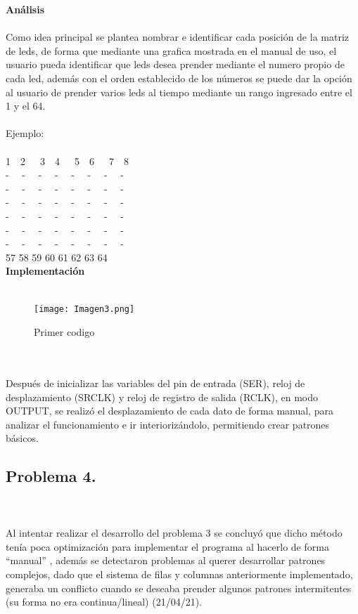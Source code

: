 \documentclass{article}
\begin{document}
\textbf{\large Análisis}\\\\
Como idea principal se plantea nombrar e identificar cada posición de la matriz de leds, de forma que mediante una grafica mostrada en el manual de uso, el usuario pueda identificar que leds desea prender mediante el numero propio de cada led, además con el orden establecido de los números se puede dar la opción al usuario de prender varios leds al tiempo mediante un rango ingresado entre el 1 y el 64.
\\
\\
Ejemplo:
\\
\\
1\  \ 2\ \ \ 3\  \ 4\ \ \ 5\  \ 6\ \ \ 7\  \ 8\\ 
- \  \  - \  \ - \  \ - \  \ - \  \ - \  \ - \   \ -\\
- \  \  - \  \ - \  \ - \  \ - \  \ - \  \ - \   \ -\\
- \  \  - \  \ - \  \ - \  \ - \  \ - \  \ - \   \ -\\
- \  \  - \  \ - \  \ - \  \ - \  \ - \  \ - \   \ -\\
- \  \  - \  \ - \  \ - \  \ - \  \ - \  \ - \   \ -\\
- \  \  - \  \ - \  \ - \  \ - \  \ - \  \ - \   \ -\\
57 58 59 60 61 62 63 64\\

\textbf{\large Implementación}\\\\
\begin{figure}[h]
    \texttt{[image: Imagen3.png]}
    \centering
    \caption{Primer codigo}
    \label{fig:Imagen3}
\end{figure}\\\\

Después de inicializar las variables del pin de entrada (SER), reloj de desplazamiento (SRCLK) y reloj de registro de salida (RCLK), en modo OUTPUT, se realizó el desplazamiento de cada dato de forma manual, para analizar el funcionamiento e ir interiorizándolo, permitiendo crear patrones básicos.\\

\subsection{\large Problema 4.}\\\\
Al intentar realizar el desarrollo del problema 3 se concluyó que dicho método tenía poca optimización para implementar el programa al hacerlo de forma “manual” , además se detectaron problemas al querer desarrollar patrones complejos, dado que el sistema de filas y columnas anteriormente implementado, generaba un conflicto cuando se deseaba prender algunos patrones intermitentes (su forma no era continua/lineal) (21/04/21). \\
\end{document}
